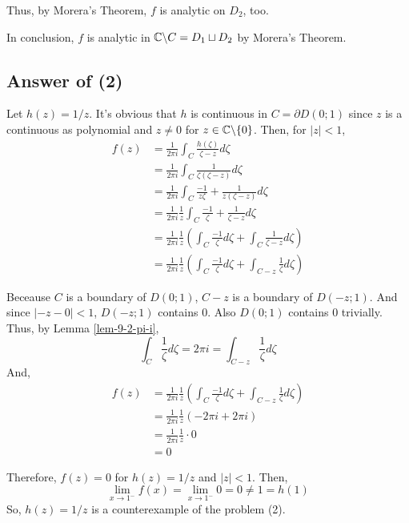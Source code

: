 Thus, by Morera's Theorem, \(f\) is analytic on \(D_2\), too.

In conclusion, \(f\) is analytic in \(\bbC \bs C = D_1 \sqcup D_2\) by Morera's Theorem.
\qedsq

\subsection*{Answer of (2)}

Let \(h(z) = 1/z\).
It's obvious that \(h\) is continuous in \(C = \partial D(0; 1)\) since \(z\) is a continuous as polynomial and \(z \neq 0\) for \(z \in \bbC \bs \{0\}\).
Then, for \(|z| < 1\),
\begin{align*}
  f(z)
  &= \frac{1}{2\pi i} \int_{C} \frac{h(\zeta)}{\zeta - z} d\zeta
  \\&= \frac{1}{2\pi i} \int_{C} \frac{1}{\zeta(\zeta - z)} d\zeta
  \\&= \frac{1}{2\pi i} \int_{C} \frac{-1}{z\zeta} + \frac{1}{z(\zeta - z)} d\zeta
  \\&= \frac{1}{2\pi i} \frac{1}{z} \int_{C} \frac{-1}{\zeta} + \frac{1}{\zeta - z} d\zeta
  \\&= \frac{1}{2\pi i} \frac{1}{z} \left( \int_{C} \frac{-1}{\zeta} d\zeta + \int_{C} \frac{1}{\zeta - z} d\zeta \right)
  \\&= \frac{1}{2\pi i} \frac{1}{z} \left( \int_{C} \frac{-1}{\zeta} d\zeta + \int_{C - z} \frac{1}{\zeta} d\zeta \right)
\end{align*}

Beceause \(C\) is a boundary of \(D(0; 1)\), \(C - z\) is a boundary of \(D(-z; 1)\). And since \(|-z - 0| < 1\), \(D(-z; 1)\) contains \(0\). Also \(D(0; 1)\) contains \(0\) trivially.
Thus, by Lemma \ref{lem-9-2-pi-i},
\[\int_{C} \frac{1}{\zeta} d\zeta = 2\pi i = \int_{C - z} \frac{1}{\zeta} d\zeta\]
And,
\begin{align*}
  f(z)
  &= \frac{1}{2\pi i} \frac{1}{z} \left( \int_{C} \frac{-1}{\zeta} d\zeta + \int_{C - z} \frac{1}{\zeta} d\zeta \right)
  \\&= \frac{1}{2\pi i} \frac{1}{z} \left( -2\pi i + 2\pi i \right)
  \\&= \frac{1}{2\pi i} \frac{1}{z} \cdot 0
  \\&= 0
\end{align*}

Therefore, \(f(z) = 0\) for \(h(z) = 1/z\) and \(|z| < 1\).
Then,
\[
  \lim_{x \to 1^-} f(x) = \lim_{x \to 1^-} 0 = 0 \neq 1 = h(1)
\]
So, \(h(z) = 1/z\) is a counterexample of the problem (2).
\qedsq